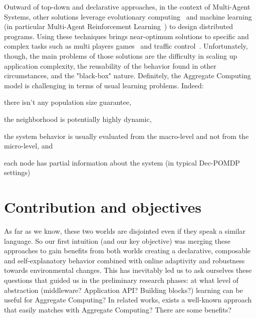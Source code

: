 \documentclass[conference]{IEEEtran}
\begin{document}
Outward of top-down and declarative approaches, in the context of Multi-Agent Systems, other solutions leverage evolutionary computing~\cite{DBLP:journals/swarm/BrambillaFBD13} and machine learning (in particular Multi-Agent Reinforcement Learning~\cite{DBLP:journals/tcyb/NguyenNN20}) to design distributed programs.
Using these techniques brings near-optimum solutions to specific and complex tasks such as multi players games~\cite{DBLP:journals/nature/VinyalsBCMDCCPE19} and traffic control~\cite{DBLP:journals/aes/JinMK17}.
Unfortunately, though, the main problems of those solutions are the difficulty in scaling up application complexity, the reusability of the behavior found in other circumstances, and the "black-box" nature. 
%
Definitely, the Aggregate Computing model is challenging in terms of usual learning problems. Indeed:
\begin{enumerate*}[label=(\roman*)]
\item there isn't any population size guarantee,
\item the neighborhood is potentially highly dynamic,
\item the system behavior is usually evaluated from the macro-level and not from the micro-level, and
\item each node has partial information about the system (in typical Dec-POMDP~\cite{DBLP:conf/uai/BernsteinZI00} settings)
\end{enumerate*}
\section{Contribution and objectives}
As far as we know, these two worlds are disjointed even if they speak a similar language. So our first intuition (and our key objective) was merging these approaches to gain benefits from both worlds creating a declarative, 
composable and self-explanatory behavior combined with online adaptivity and robustness towards environmental changes.
%
This has inevitably led us to ask ourselves these questions that guided us in the preliminary research phases: at what level of abstraction (middleware? Application API? Building blocks?) learning can be useful for Aggregate Computing? 
In related works, exists a well-known approach that easily matches with Aggregate Computing? There are some benefits?
%
\end{document}
